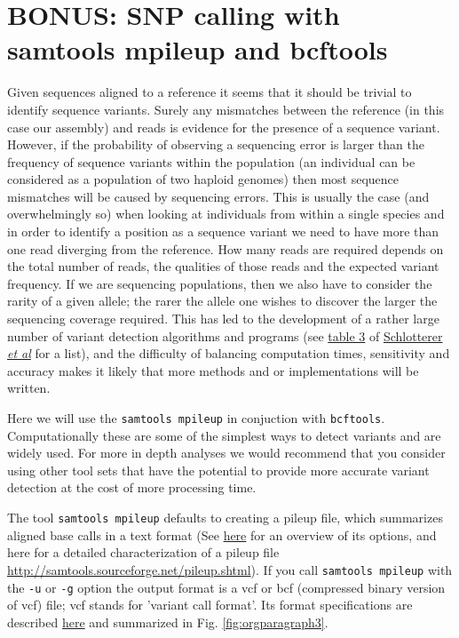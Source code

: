 \documentclass[11pt]{article}
\begin{document}
\section{BONUS: SNP calling with samtools mpileup and bcftools}
\label{sec:orgheadline11}
Given sequences aligned to a reference it seems that it should be trivial to
identify sequence variants. Surely any mismatches between the reference (in this case our assembly)
and reads is evidence for the
presence of a sequence variant. However, if the probability of observing a
sequencing error is larger than the frequency of sequence variants within the
population (an individual can be considered as a population of
two haploid genomes) then most sequence mismatches will be caused by
sequencing errors. This is usually the case (and overwhelmingly so) when looking at individuals from
within a single species and in order to identify a position as a sequence
variant we need to have more than one read diverging from the reference. How
many reads are required depends on the total number of reads, the qualities
of those reads and the expected variant frequency. If we are sequencing
populations, then we also have to consider the rarity of a given allele;
the rarer the allele one wishes to discover the larger the sequencing coverage
required. This has led to the
development of a rather large number of variant detection algorithms and
programs (see
\href{http://www.nature.com/nrg/journal/v15/n11/fig_tab/nrg3803_T3.html}{table 3} of \href{http://www.nature.com/nrg/journal/v15/n11/full/nrg3803.html}{Schlotterer \emph{et al}} for a list), and the difficulty of balancing
computation times, sensitivity and accuracy makes it likely that more methods
and or implementations will be written.

Here we will use the \texttt{samtools mpileup} in conjuction with 
\texttt{bcftools}. Computationally these are some of the simplest ways to detect variants
and are widely used. For more in depth analyses we would recommend that you
consider using other tool sets that have the potential to provide more
accurate variant detection at the cost of more processing time.

The tool \texttt{samtools mpileup} defaults to creating a pileup file, which summarizes aligned
base calls in a text format (See \href{http://samtools.sourceforge.net/samtools.shtml}{here} for an overview of its options, and here for a detailed characterization of
a pileup file \url{http://samtools.sourceforge.net/pileup.shtml}). If you
call \texttt{samtools mpileup} with the \texttt{-u} or \texttt{-g} option the
output format is a vcf or bcf (compressed binary version of vcf) file;
vcf stands for 'variant call format'. Its format specifications are
described \href{https://samtools.github.io/hts-specs/VCFv4.2.pdf}{here} and summarized in Fig. \ref{fig:orgparagraph3}.
\end{document}
